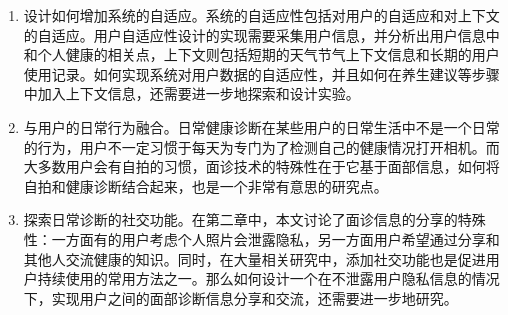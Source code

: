 \begin{enumerate}
	\item 设计如何增加系统的自适应。系统的自适应性包括对用户的自适应和对上下文的自适应。用户自适应性设计的实现需要采集用户信息，并分析出用户信息中和个人健康的相关点，上下文则包括短期的天气节气上下文信息和长期的用户使用记录。如何实现系统对用户数据的自适应性，并且如何在养生建议等步骤中加入上下文信息，还需要进一步地探索和设计实验。

	\item 与用户的日常行为融合。日常健康诊断在某些用户的日常生活中不是一个日常的行为，用户不一定习惯于每天为专门为了检测自己的健康情况打开相机。而大多数用户会有自拍的习惯，面诊技术的特殊性在于它基于面部信息，如何将自拍和健康诊断结合起来，也是一个非常有意思的研究点。

	\item 探索日常诊断的社交功能。在第二章中，本文讨论了面诊信息的分享的特殊性：一方面有的用户考虑个人照片会泄露隐私，另一方面用户希望通过分享和其他人交流健康的知识。同时，在大量相关研究中，添加社交功能也是促进用户持续使用的常用方法之一。那么如何设计一个在不泄露用户隐私信息的情况下，实现用户之间的面部诊断信息分享和交流，还需要进一步地研究。
	
\end{enumerate}